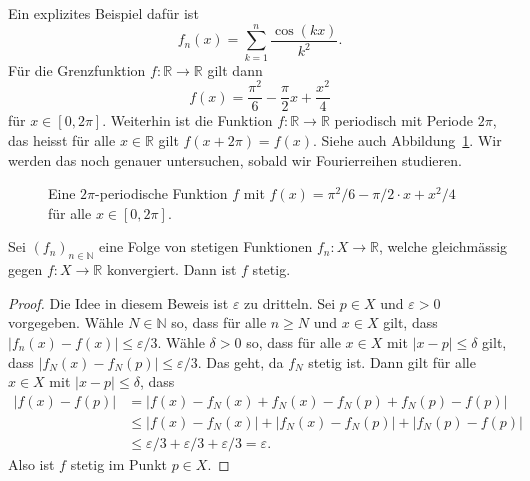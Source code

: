 \documentclass[../main.tex]{subfiles}
\begin{document}
\begin{examples}
\begin{enumerate}[(1)]
      Ein explizites Beispiel dafür ist
      \[
        f_n(x) = \sum_{k=1}^{n} \frac{\cos(kx)}{k^2}.
      \]
      Für die Grenzfunktion $f \colon\mathbb{R} \to \mathbb{R}$ gilt dann
      \[
        f(x) = \frac{\pi^2}{6} - \frac{\pi}{2}x + \frac{x^2}{4}
      \]
      für $x \in [0, 2 \pi]$. Weiterhin ist die Funktion
      $f \colon \mathbb{R} \to \mathbb{R}$ periodisch mit Periode
      $2 \pi$, das heisst für alle $x \in \mathbb{R}$ gilt $f(x + 2\pi) = f(x)$.
      Siehe auch Abbildung~\ref{fig:pi-squared-sixths}.
      Wir werden das noch genauer untersuchen, sobald wir Fourierreihen studieren.
      
      \begin{figure}[htb]
        \centering
        
        \caption{Eine $2\pi$-periodische Funktion $f$
        mit $f(x) = \pi^2/6 - \pi/2 \cdot x + x^2/4$
      für alle $x \in [0, 2\pi]$.}%
        \label{fig:pi-squared-sixths}
      \end{figure}
  \end{enumerate}
\end{examples}

\begin{theorem}\label{thm:weierstrass}
  Sei ${(f_{n})}_{n \in \mathbb{N}}$ eine Folge von stetigen Funktionen
  $f_n \colon X \to \mathbb{R}$, welche gleichmässig gegen
  $f \colon X \to \mathbb{R}$ konvergiert.
  Dann ist $f$ stetig.
\end{theorem}

\begin{proof}
  Die Idee in diesem Beweis ist $\varepsilon$ zu dritteln.
  Sei $p \in X$ und $\varepsilon > 0$ vorgegeben.
  Wähle $N \in \mathbb{N}$ so, dass für alle $n \geq N$ 
  und $x \in X$ gilt, dass
  $|f_n(x) - f(x)| \leq \varepsilon /3$.
  Wähle $\delta > 0$ so, dass
  für alle $x \in X$ mit $|x - p| \leq \delta$ gilt,
  dass
  \(
    |f_N(x) - f_N(p)| \leq \varepsilon/3.
  \)
  Das geht, da $f_N$ stetig ist.
  Dann gilt für alle $x \in X$ mit $|x - p| \leq \delta$, dass
  \begin{align*}
    |f(x) - f(p)| &= |f(x) - f_N(x) + f_N(x) - f_N(p) + f_N(p) - f(p)| \\
                  & \leq |f(x)  -f_N(x)| + |f_N(x) - f_N(p)| + |f_N(p) - f(p)|\\
                  & \leq \varepsilon/3 + \varepsilon/3 + \varepsilon/3 = \varepsilon.
  \end{align*}
  Also ist $f$ stetig im Punkt $p \in X$.
\end{proof}
\end{document}
